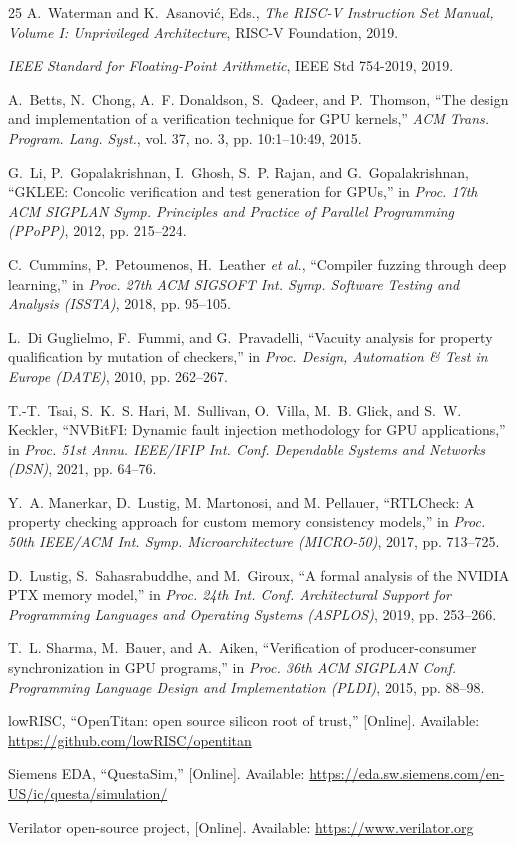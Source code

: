 \documentclass[conference]{IEEEtran}
\begin{document}
\begin{thebibliography}{25}
	A.~Waterman and K.~Asanovi\'c, Eds., \emph{The RISC-V Instruction Set
		Manual, Volume I: Unprivileged Architecture},
	RISC-V Foundation, 2019.

	\emph{IEEE Standard for Floating-Point Arithmetic}, IEEE Std
	754-2019, 2019.

	A.~Betts, N.~Chong, A.~F. Donaldson, S.~Qadeer, and P.~Thomson,
	``The design and implementation of a verification technique for GPU
	kernels,'' \emph{ACM Trans. Program. Lang. Syst.}, vol. 37, no. 3,
	pp. 10:1--10:49, 2015.

	G.~Li, P.~Gopalakrishnan, I.~Ghosh, S.~P. Rajan, and G.~Gopalakrishnan,
	``GKLEE: Concolic verification and test generation for GPUs,''
	in \emph{Proc. 17th ACM SIGPLAN Symp. Principles and Practice of
		Parallel Programming (PPoPP)}, 2012, pp. 215--224.

	C.~Cummins, P.~Petoumenos, H.~Leather \emph{et al.},
	``Compiler fuzzing through deep learning,'' in \emph{Proc. 27th ACM
		SIGSOFT Int. Symp. Software Testing and Analysis (ISSTA)}, 2018,
	pp. 95--105.

	L.~Di Guglielmo, F.~Fummi, and G.~Pravadelli,
	``Vacuity analysis for property qualification by mutation of
	checkers,'' in \emph{Proc. Design, Automation \& Test in Europe
		(DATE)}, 2010, pp. 262--267.

	T.-T.~Tsai, S.~K.~S. Hari, M.~Sullivan, O.~Villa, M.~B. Glick, and
	S.~W. Keckler, ``NVBitFI: Dynamic fault injection methodology for GPU
	applications,'' in \emph{Proc. 51st Annu. IEEE/IFIP Int. Conf.
		Dependable Systems and Networks (DSN)}, 2021, pp. 64--76.

	Y.~A. Manerkar, D.~Lustig, M. Martonosi, and M. Pellauer,
	``RTLCheck: A property checking approach for custom memory consistency
	models,'' in \emph{Proc. 50th IEEE/ACM Int. Symp. Microarchitecture
		(MICRO-50)}, 2017, pp. 713--725.

	D.~Lustig, S.~Sahasrabuddhe, and M.~Giroux,
	``A formal analysis of the NVIDIA PTX memory model,'' in \emph{Proc.
		24th Int. Conf. Architectural Support for Programming Languages and
		Operating Systems (ASPLOS)}, 2019, pp. 253--266.

	T.~L. Sharma, M.~Bauer, and A.~Aiken,
	``Verification of producer-consumer synchronization in GPU programs,''
	in \emph{Proc. 36th ACM SIGPLAN Conf. Programming Language Design and
		Implementation (PLDI)}, 2015, pp. 88--98.

	lowRISC, ``OpenTitan: open source silicon root of trust,'' [Online].
	Available: \url{https://github.com/lowRISC/opentitan}

	Siemens EDA, ``QuestaSim,'' [Online]. Available:
	\url{https://eda.sw.siemens.com/en-US/ic/questa/simulation/}

	Verilator open-source project, [Online]. Available:
	\url{https://www.verilator.org}

\end{thebibliography}
\end{document}
